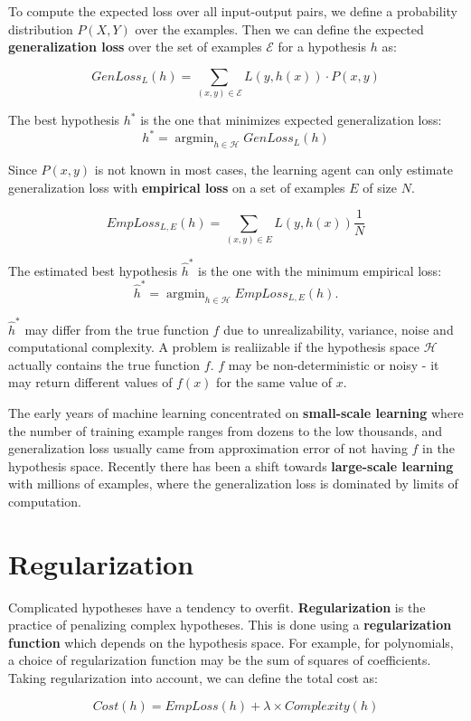 \documentclass{article}
\DeclareMathOperator*{\argmin}{argmin}
\begin{document}
To compute the expected loss over all input-output pairs, we define
a probability distribution $P(X, Y)$ over the examples. Then we can define
the expected \textbf{generalization loss} over the set of examples
$\mathcal E$ for a hypothesis $h$ as:

\[
GenLoss_L(h) = \sum_{(x, y) \in \mathcal E} L(y, h(x)) \cdot P(x, y)
\]

The best hypothesis $h^*$ is the one that minimizes expected
generalization loss:
\[
h^* = \argmin_{h \in \mathcal H} GenLoss_L(h)
\]

Since $P(x, y)$ is not known in most cases, the learning agent can
only estimate generalization loss with \textbf{empirical loss} on a set
of examples $E$ of size $N$.

\[
EmpLoss_{L,E} (h) = \sum_{(x, y) \in E} L(y, h(x)) \frac{1}{N}
\]

The estimated best hypothesis $\hat h^*$ is the one with the minimum
empirical loss:
\[ 
\hat h^* = \argmin_{h \in \mathcal H} EmpLoss_{L,E}(h).
\]

$\hat h^*$ may differ from the true function $f$ due to unrealizability,
variance, noise and computational complexity. A problem is realiizable if the
hypothesis space $\mathcal H$ actually contains the true function $f$. $f$ may be
non-deterministic or noisy - it may return different values of $f(x)$ for the same
value of $x$.

The early years of machine learning concentrated on \textbf{small-scale learning} where
the number of training example ranges from dozens to the low thousands, and
generalization loss usually came from approximation error of not having $f$ in the 
hypothesis space. Recently there has been a shift towards \textbf{large-scale learning}
with millions of examples, where the generalization loss is dominated by limits of
computation.

\section{Regularization}

Complicated hypotheses have a tendency to overfit. \textbf{Regularization} is the
practice of penalizing complex hypotheses. This is done using a
\textbf{regularization function} which depends on the hypothesis space. For example,
for polynomials, a choice of regularization function may be the sum of squares of
coefficients. Taking regularization into account, we can define the total cost as:

\[
Cost(h) = EmpLoss(h) + \lambda \times Complexity(h)
\]
\end{document}
